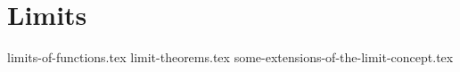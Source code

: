 \chapter{Limits}
{limits-of-functions.tex}
{limit-theorems.tex}
{some-extensions-of-the-limit-concept.tex}
